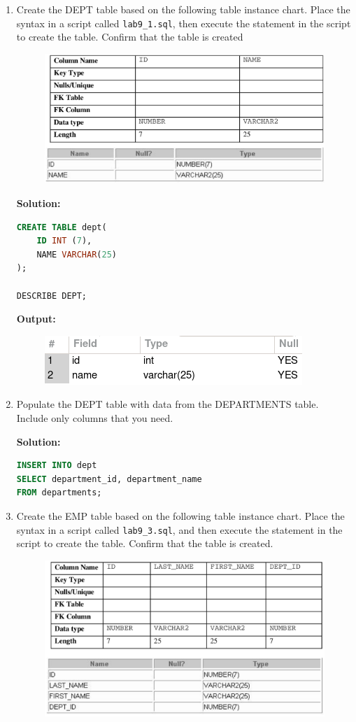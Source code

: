 \begin{enumerate}

\item Create the DEPT table based on the following table instance chart. Place the
syntax in a script called \texttt{lab9\_1.sql}, then execute the statement in the script to create the table.
Confirm that the table is created
\begin{figure}[h]
\centering
    \includegraphics[width=.7\linewidth]{graphics/91.png}
\end{figure}

\textbf{Solution: }
\begin{lstlisting}[language=SQL]
CREATE TABLE dept(
    ID INT (7),
    NAME VARCHAR(25)
);

DESCRIBE DEPT;
\end{lstlisting}
\textbf{Output: }
\begin{figure}[h]
    \centering
    \includegraphics[width=0.5\linewidth]{graphics/p91.png}
\end{figure}

\item Populate the DEPT table with data from the DEPARTMENTS table. Include only columns that
you need.

\textbf{Solution: }
\begin{lstlisting}[language=SQL]
INSERT INTO dept
SELECT department_id, department_name
FROM departments;
\end{lstlisting}

\item Create the EMP table based on the following table instance chart. Place the syntax in a script called
\texttt{lab9\_3.sql}, and then execute the statement in the script to create the table. Confirm that the table is
created.
\begin{figure}[h]
\centering
    \includegraphics[width=.7\linewidth]{graphics/93.png}
\end{figure}


\end{enumerate}
